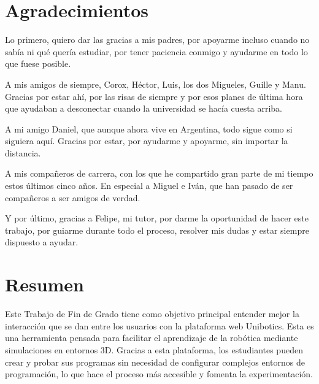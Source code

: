 \documentclass[a4paper, 12pt]{book}
\begin{document}

\chapter*{Agradecimientos}

Lo primero, quiero dar las gracias a mis padres, por apoyarme incluso cuando no sabía ni qué quería estudiar, por tener paciencia conmigo y ayudarme en todo lo que fuese posible.

A mis amigos de siempre, Corox, Héctor, Luis, los dos Migueles, Guille y Manu. Gracias por estar ahí, por las risas de siempre y por esos planes de última hora que ayudaban a desconectar cuando la universidad se hacía cuesta arriba.

A mi amigo Daniel, que aunque ahora vive en Argentina, todo sigue como si siguiera aquí. Gracias por estar, por ayudarme y apoyarme, sin importar la distancia.

A mis compañeros de carrera, con los que he compartido gran parte de mi tiempo estos últimos cinco años. En especial a Miguel e Iván, que han pasado de ser compañeros a ser amigos de verdad.

Y por último, gracias a Felipe, mi tutor, por darme la oportunidad de hacer este trabajo, por guiarme durante todo el proceso, resolver mis dudas y estar siempre dispuesto a ayudar. 


\chapter*{Resumen}

Este Trabajo de Fin de Grado tiene como objetivo principal entender mejor la interacción que se dan entre los usuarios con la plataforma web Unibotics. Esta es una herramienta pensada para facilitar el aprendizaje de la robótica mediante simulaciones en entornos 3D. Gracias a esta plataforma, los estudiantes pueden crear y probar sus programas sin necesidad de configurar complejos entornos de programación, lo que hace el proceso más accesible y fomenta la experimentación.
\end{document}
